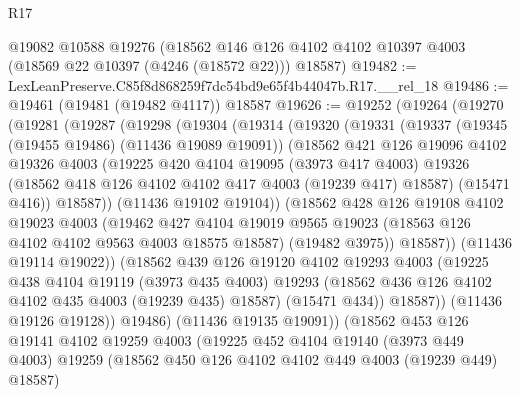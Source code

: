 \begin{lexlean}{R17}
\begin{coremodule}
    @19082
    @10588
    @19276
    (@18562 @146 @126 @4102 @4102 @10397 @4003 (@18569 @22 @10397 (@4246 (@18572 @22))) @18587)
@19482 := LexLeanPreserve.C85f8d868259f7dc54bd9e65f4b44047b.R17.__rel_18
@19486 := @19461 (@19481 (@19482 @4117)) @18587
@19626 := @19252
    (@19264
      (@19270
        (@19281
          (@19287
            (@19298
              (@19304
                (@19314
                  (@19320
                    (@19331
                      (@19337
                        (@19345 (@19455 @19486) (@11436 @19089 @19091))
                        (@18562
                          @421
                          @126
                          @19096
                          @4102
                          @19326
                          @4003
                          (@19225
                            @420
                            @4104
                            @19095
                            (@3973 @417 @4003)
                            @19326
                            (@18562 @418 @126 @4102 @4102 @417 @4003 (@19239 @417) @18587)
                            (@15471 @416))
                          @18587))
                      (@11436 @19102 @19104))
                    (@18562
                      @428
                      @126
                      @19108
                      @4102
                      @19023
                      @4003
                      (@19462
                        @427
                        @4104
                        @19019
                        @9565
                        @19023
                        (@18563 @126 @4102 @4102 @9563 @4003 @18575 @18587)
                        (@19482 @3975))
                      @18587))
                  (@11436 @19114 @19022))
                (@18562
                  @439
                  @126
                  @19120
                  @4102
                  @19293
                  @4003
                  (@19225
                    @438
                    @4104
                    @19119
                    (@3973 @435 @4003)
                    @19293
                    (@18562 @436 @126 @4102 @4102 @435 @4003 (@19239 @435) @18587)
                    (@15471 @434))
                  @18587))
              (@11436 @19126 @19128))
            @19486)
          (@11436 @19135 @19091))
        (@18562
          @453
          @126
          @19141
          @4102
          @19259
          @4003
          (@19225
            @452
            @4104
            @19140
            (@3973 @449 @4003)
            @19259
            (@18562 @450 @126 @4102 @4102 @449 @4003 (@19239 @449) @18587)

\end{coremodule}
\end{lexlean}
